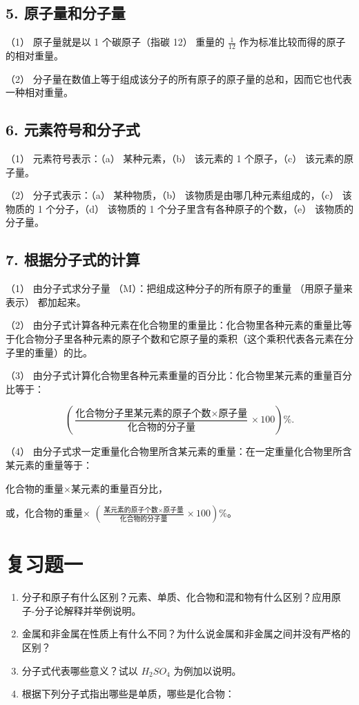 \subsection{5. 原子量和分子量}

（1） 原子量就是以 1 个碳原子（指碳 12） 重量的 \(\frac{1}{12}\)
作为标准比较而得的原子的相对重量。

（2）
分子量在数值上等于组成该分子的所有原子的原子量的总和，因而它也代表一种相对重量。

\subsection{6. 元素符号和分子式}

（1） 元素符号表示：（a） 某种元素，（b） 该元素的 1 个原子，（c）
该元素的原子量。

（2） 分子式表示：（a） 某种物质，（b）
该物质是由哪几种元素组成的，（c） 该物质的 1 个分子，（d） 该物质的 1
个分子里含有各种原子的个数，（e） 该物质的分子量。

\subsection{7. 根据分子式的计算}

（1） 由分子式求分子量 （M）：把组成这种分子的所有原子的重量
（用原子量来表示） 都加起来。

（2）
由分子式计算各种元素在化合物里的重量比：化合物里各种元素的重量比等于化合物分子里各种元素的原子个数和它原子量的乘积（这个乘积代表各元素在分子里的重量）的比。

（3）
由分子式计算化合物里各种元素重量的百分比：化合物里某元素的重量百分比等于：

\[
\left(\frac {\text{化合物分子里某元素的原子个数} \times \text{原子量}}{\text{化合物的分子量}} \times 100\right) \% .
\]

（4）
由分子式求一定重量化合物里所含某元素的重量：在一定重量化合物里所含某元素的重量等于：

化合物的重量×某元素的重量百分比，

或，化合物的重量×
\(\left(\frac{\text{某元素的原子个数}\times\text{原子量}}{\text{化合物的分子量}}\times100\right)\%\)。

\section{复习题一}

\begin{enumerate}
\item
  分子和原子有什么区别？元素、单质、化合物和混和物有什么区别？应用原子-分子论解释并举例说明。
\item
  金属和非金属在性质上有什么不同？为什么说金属和非金属之间并没有严格的区别？
\item
  分子式代表哪些意义？试以 \(H_{2}SO_{4}\) 为例加以说明。
\item
  根据下列分子式指出哪些是单质，哪些是化合物：
\end{enumerate}

